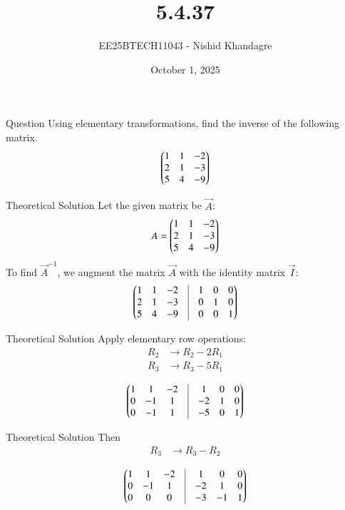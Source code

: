 \documentclass{beamer}
\title
{5.4.37}
\date{October 1, 2025}
\author
{EE25BTECH11043 - Nishid Khandagre}
\begin{document}
\frame{\titlepage}

\begin{frame}{Question}
Using elementary transformations, find the inverse of the following matrix.
\begin{align*}
\begin{pmatrix}
1 & 1 & -2 \\
2 & 1 & -3 \\
5 & 4 & -9\end{pmatrix}
\end{align*}
\end{frame}

\begin{frame}{Theoretical Solution}
Let the given matrix be $\vec{A}$:
\begin{align}
A = \begin{pmatrix}
1 & 1 & -2 \\
2 & 1 & -3 \\
5 & 4 & -9\end{pmatrix}
\end{align}
To find $\vec{A}^{-1}$, we augment the matrix $\vec{A}$ with the identity matrix $\vec{I}$:
\begin{align}
\myvec{
        1 & 1 & -2 & \vrule & 1 & 0 & 0 \\
        2 & 1 & -3 & \vrule & 0 & 1 & 0 \\
        5 & 4 & -9 & \vrule & 0 & 0 & 1
    }
\end{align}
\end{frame}

\begin{frame}{Theoretical Solution}
Apply elementary row operations:
\begin{align*}
R_2 &\rightarrow R_2 - 2R_1 \\
R_3 &\rightarrow R_3 - 5R_1 \\
\end{align*}
\begin{align}
\myvec{
1 & 1 & -2 & \vrule & 1 & 0 & 0 \\
0 & -1 & 1 & \vrule & -2 & 1 & 0 \\
0 & -1 & 1 & \vrule & -5 & 0 & 1
}
\end{align}
\end{frame}

\begin{frame}{Theoretical Solution}
Then
\begin{align*}
R_3 &\rightarrow R_3 - R_2 \\
\end{align*}
\begin{align}
\myvec{
1 & 1 & -2 & \vrule & 1 & 0 & 0 \\
0 & -1 & 1 & \vrule & -2 & 1 & 0 \\
0 & 0 & 0 &  \vrule & -3 & -1 & 1
}
\end{align}
\end{frame}
\end{document}
